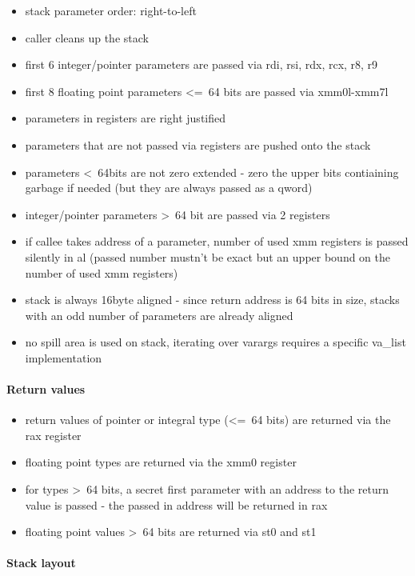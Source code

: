 \begin{itemize}
\item stack parameter order: right-to-left
\item caller cleans up the stack
\item first 6 integer/pointer parameters are passed via rdi, rsi, rdx, rcx, r8, r9
\item first 8 floating point parameters \textless=\ 64 bits are passed via xmm0l-xmm7l
\item parameters in registers are right justified
\item parameters that are not passed via registers are pushed onto the stack
\item parameters \textless\ 64bits are not zero extended - zero the upper bits contiaining garbage if needed (but they are always
passed as a qword)
\item integer/pointer parameters \textgreater\ 64 bit are passed via 2 registers
\item if callee takes address of a parameter, number of used xmm registers is passed silently in al (passed number mustn't be
exact but an upper bound on the number of used xmm registers)
\item stack is always 16byte aligned - since return address is 64 bits in size, stacks with an odd number of parameters are
already aligned
\item no spill area is used on stack, iterating over varargs requires a specific va\_list implementation
\end{itemize}


\paragraph{Return values}

\begin{itemize}
\item return values of pointer or integral type (\textless=\ 64 bits) are returned via the rax register
\item floating point types are returned via the xmm0 register
\item for types \textgreater\ 64 bits, a secret first parameter with an address to the return value is passed - the passed in address
will be returned in rax
\item floating point values \textgreater\ 64 bits are returned via st0 and st1
\end{itemize}


\paragraph{Stack layout}

